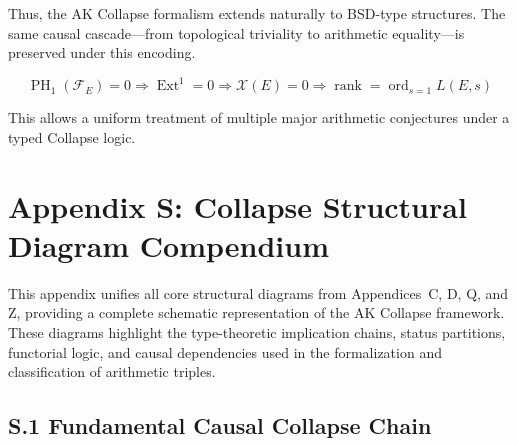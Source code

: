 \documentclass[11pt]{article}
\DeclareMathOperator{\Ext}{Ext}
\DeclareMathOperator{\PH}{PH}
\newcommand{\Sha}{\mathcal{X}}
\begin{document}
Thus, the AK Collapse formalism extends naturally to BSD-type structures.  
The same causal cascade—from topological triviality to arithmetic equality—is preserved under this encoding.

\[
\boxed{
\PH_1(\mathcal{F}_E) = 0 \Rightarrow \Ext^1 = 0 \Rightarrow \Sha(E) = 0 \Rightarrow \operatorname{rank} = \operatorname{ord}_{s=1} L(E,s)
}
\]

This allows a uniform treatment of multiple major arithmetic conjectures under a typed Collapse logic.



\section*{Appendix S: Collapse Structural Diagram Compendium}

This appendix unifies all core structural diagrams from Appendices~C, D, Q, and Z, providing a complete schematic representation of the AK Collapse framework. These diagrams highlight the type-theoretic implication chains, status partitions, functorial logic, and causal dependencies used in the formalization and classification of arithmetic triples.

\subsection*{S.1 Fundamental Causal Collapse Chain}

\begin{center}
\end{center}
\end{document}
